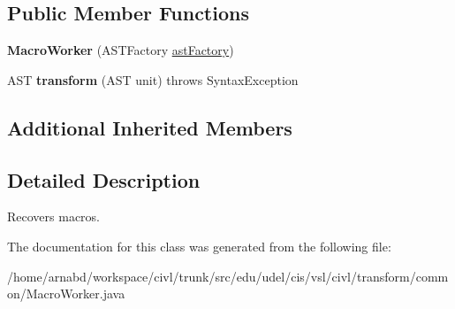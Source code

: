 \subsection*{Public Member Functions}
\begin{DoxyCompactItemize}
\item 
\hypertarget{classedu_1_1udel_1_1cis_1_1vsl_1_1civl_1_1transform_1_1common_1_1MacroWorker_a1a9521373a936f8c1e0a08a7b740468c}{}{\bfseries Macro\+Worker} (A\+S\+T\+Factory \hyperlink{classedu_1_1udel_1_1cis_1_1vsl_1_1civl_1_1transform_1_1common_1_1BaseWorker_a44812bb476e4511fb6ca29a808427186}{ast\+Factory})\label{classedu_1_1udel_1_1cis_1_1vsl_1_1civl_1_1transform_1_1common_1_1MacroWorker_a1a9521373a936f8c1e0a08a7b740468c}

\item 
\hypertarget{classedu_1_1udel_1_1cis_1_1vsl_1_1civl_1_1transform_1_1common_1_1MacroWorker_a064c22faf9339206903aabc605a775fe}{}A\+S\+T {\bfseries transform} (A\+S\+T unit)  throws Syntax\+Exception \label{classedu_1_1udel_1_1cis_1_1vsl_1_1civl_1_1transform_1_1common_1_1MacroWorker_a064c22faf9339206903aabc605a775fe}

\end{DoxyCompactItemize}
\subsection*{Additional Inherited Members}


\subsection{Detailed Description}
Recovers macros. 

The documentation for this class was generated from the following file\+:\begin{DoxyCompactItemize}
\item 
/home/arnabd/workspace/civl/trunk/src/edu/udel/cis/vsl/civl/transform/common/Macro\+Worker.\+java\end{DoxyCompactItemize}
